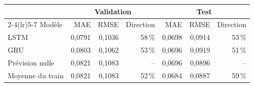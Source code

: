 \begin{tabular}{lrrrrrr}\toprule
 & \multicolumn{3}{c}{Validation} & \multicolumn{3}{c}{Test} \\\cmidrule(lr){2-4}\cmidrule(lr){5-7}
Modèle & MAE & RMSE & Direction & MAE & RMSE & Direction \\\midrule
LSTM & 0,0791 & 0,1036 & 58\,\% & 0,0698 & 0,0914 & 53\,\% \\
GRU & 0,0803 & 0,1062 & 53\,\% & 0,0696 & 0,0919 & 51\,\% \\
Prévision nulle & 0,0821 & 0,1083 & -- & 0,0696 & 0,0896 & -- \\
Moyenne du train & 0,0821 & 0,1083 & 52\,\% & 0,0684 & 0,0887 & 59\,\% \\
\bottomrule\end{tabular}
